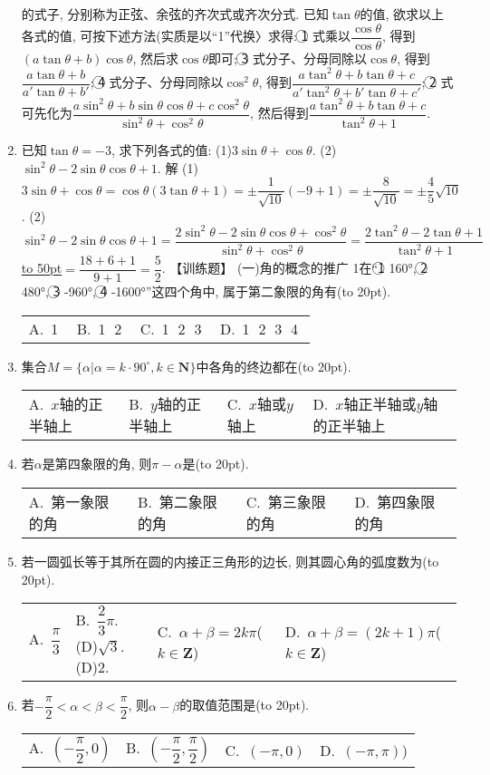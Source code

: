 \documentclass[10pt,a4paper]{article}
\newcommand{\blank}[1]{\underline{\hbox to #1pt{}}}
\newcommand{\bracket}[1]{(\hbox to #1pt{})}
\newcommand{\fourch}[4]{\par\begin{tabular}{p{.23\textwidth}p{.23\textwidth}p{.23\textwidth}p{.23\textwidth}}
A.~#1 &B.~#2& C.~#3& D.~#4
\end{tabular}}
\begin{document}
\begin{enumerate}[1.]
的式子, 分别称为正弦、余弦的齐次式或齐次分式.
已知$\tan \theta$的值, 欲求以上各式的值, 可按下述方法(实质是以``1''代换〉求得:
\textcircled{1} 式乘以$\dfrac{\cos \theta }{\cos \theta }$, 得到$(a\tan \theta +b)\cos \theta$, 然后求$\cos \theta$即可;
\textcircled{3} 式分子、分母同除以$\cos \theta$, 得到$\dfrac{a\tan \theta +b}{a'\tan \theta +b'}$;
\textcircled{4} 式分子、分母同除以$\cos ^2\theta$, 得到$\dfrac{a\tan ^2\theta +b\tan \theta +c}{a'\tan ^2\theta +b'\tan \theta +c'}$;
\textcircled{2} 式可先化为$\dfrac{a\sin ^2\theta +b\sin \theta \cos \theta +c\cos ^2\theta }{\sin ^2\theta +\cos ^2\theta }$, 然后得到$\dfrac{a\tan ^2\theta +b\tan \theta +c}{\tan ^2\theta +1}$.
\item 已知$\tan \theta =-3$, 求下列各式的值:
(1)$3\sin \theta +\cos \theta$.						(2)$\sin ^2\theta -2\sin \theta \cos \theta +1$.
解  (1)$3\sin \theta +\cos \theta =\cos \theta (3\tan \theta +1)=\pm \dfrac 1{\sqrt {10}}(-9+1)=\pm \dfrac 8{\sqrt {10}}=\pm \dfrac 45\sqrt {10}$.
(2)$\sin ^2\theta -2\sin \theta \cos \theta +1=\dfrac{2\sin ^2\theta -2\sin \theta \cos \theta +\cos ^2\theta }{\sin ^2\theta +\cos ^2\theta }=\dfrac{2\tan ^2\theta -2\tan \theta +1}{\tan ^2\theta +1}$
\blank{50}$=\dfrac{18+6+1}{9+1}=\dfrac 52$.
【训练题】
(一)角的概念的推广
1在``\textcircled{1} 160°, \textcircled{2} 480°, \textcircled{3} -960°, \textcircled{4} -1600°''这四个角中, 属于第二象限的角有\bracket{20}.
\fourch{\textcircled{1} }{\textcircled{1} \textcircled{2} }{\textcircled{1} \textcircled{2} \textcircled{3} }{\textcircled{1} \textcircled{2} \textcircled{3} \textcircled{4} }
\item 集合$M=\{\alpha|\alpha =k\cdot 90^\circ ,k\in \mathbf{N}\}$中各角的终边都在\bracket{20}.
\fourch{$x$轴的正半轴上}{$y$轴的正半轴上}{$x$轴或$y$轴上}{$x$轴正半轴或$y$轴的正半轴上}
\item 若$\alpha$是第四象限的角, 则$\pi -\alpha$是\bracket{20}.
\fourch{第一象限的角}{第二象限的角}{第三象限的角}{第四象限的角}
\item 若一圆弧长等于其所在圆的内接正三角形的边长, 则其圆心角的弧度数为\bracket{20}.
\fourch{$\dfrac{\pi }3$}{$\dfrac 23\pi$.			(D)$\sqrt 3$.		(D)2.
\item 若$\alpha$和$\beta$的终边关于$y$轴对称, 则必有\bracket{20}.
(A)$\alpha +\beta =\dfrac{\pi }2$						(B)$\alpha +\beta =(2k+\dfrac 12)\pi$($k\in \mathbf{Z}$)}{$\alpha +\beta =2k\pi$($k\in \mathbf{Z}$)}{$\alpha +\beta =(2k+1)\pi$($k\in \mathbf{Z}$)}
\item 若$-\dfrac{\pi }2<\alpha <\beta <\dfrac{\pi }2$, 则$\alpha -\beta$的取值范围是\bracket{20}.
\fourch{$(-\dfrac{\pi }2,0)$}{$(-\dfrac{\pi }2,\dfrac{\pi }2)$}{$(-\pi ,0)$}{$(-\pi ,\pi)$)}

\end{enumerate}
\end{document}
